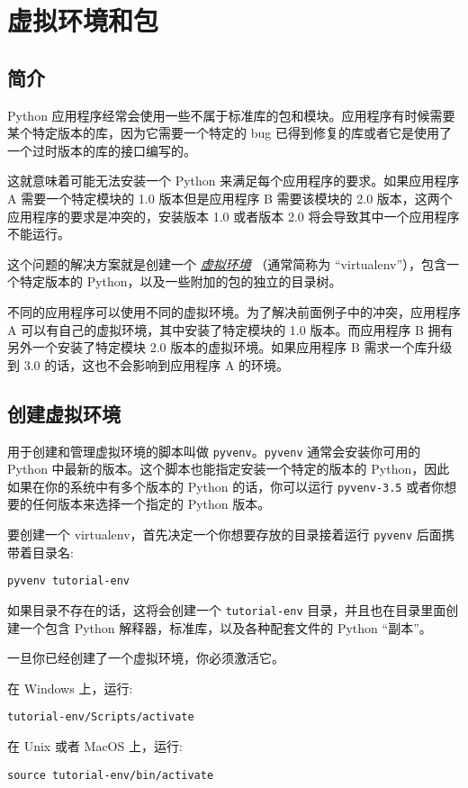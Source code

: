 \chapter{虚拟环境和包\label{VirtualEnv}}
\section{简介}
Python 应用程序经常会使用一些不属于标准库的包和模块。应用程序有时候需要某个特定版本的库，因为它需要一个特定的 bug 已得到修复的库或者它是使用了一个过时版本的库的接口编写的。

这就意味着可能无法安装一个 Python 来满足每个应用程序的要求。如果应用程序 A 需要一个特定模块的 1.0 版本但是应用程序 B 需要该模块的 2.0 版本，这两个应用程序的要求是冲突的，安装版本 1.0 或者版本 2.0 将会导致其中一个应用程序不能运行。

这个问题的解决方案就是创建一个 \href{https://docs.python.org/3/glossary.html#term-virtual-environment}{\textit{虚拟环境}} （通常简称为 “virtualenv”），包含一个特定版本的 Python，以及一些附加的包的独立的目录树。

不同的应用程序可以使用不同的虚拟环境。为了解决前面例子中的冲突，应用程序 A 可以有自己的虚拟环境，其中安装了特定模块的 1.0 版本。而应用程序 B 拥有另外一个安装了特定模块 2.0 版本的虚拟环境。如果应用程序 B 需求一个库升级到 3.0 的话，这也不会影响到应用程序 A 的环境。
\section{创建虚拟环境}
用于创建和管理虚拟环境的脚本叫做 \texttt{pyvenv}。\texttt{pyvenv} 通常会安装你可用的 Python 中最新的版本。这个脚本也能指定安装一个特定的版本的 Python，因此如果在你的系统中有多个版本的 Python 的话，你可以运行 \texttt{pyvenv-3.5} 或者你想要的任何版本来选择一个指定的 Python 版本。

要创建一个 virtualenv，首先决定一个你想要存放的目录接着运行 \texttt{pyvenv} 后面携带着目录名:

\verb|pyvenv tutorial-env|

如果目录不存在的话，这将会创建一个 \texttt{tutorial-env} 目录，并且也在目录里面创建一个包含 Python 解释器，标准库，以及各种配套文件的 Python “副本”。

一旦你已经创建了一个虚拟环境，你必须激活它。

在 Windows 上，运行:

\verb|tutorial-env/Scripts/activate|

在 Unix 或者 MacOS 上，运行:

\verb|source tutorial-env/bin/activate|


